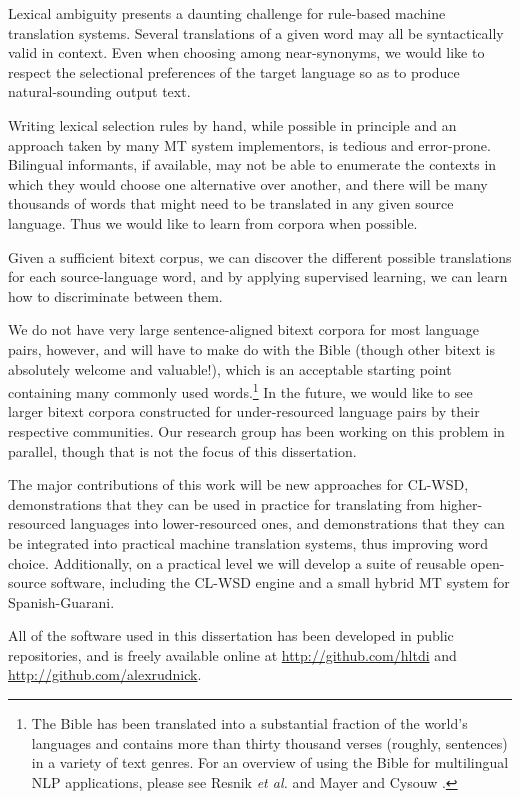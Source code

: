 Lexical ambiguity presents a daunting challenge for rule-based machine
translation systems. Several translations of a given word may all be
syntactically valid in context.
Even when choosing among near-synonyms, we would like to respect the
selectional preferences of the target language so as to produce
natural-sounding output text.

Writing lexical selection rules by hand, while possible in principle and an
approach taken by many MT system implementors, is tedious and error-prone.
Bilingual informants, if available, may not be able to enumerate the contexts
in which they would choose one alternative over another, and there will be many
thousands of words that might need to be translated in any given source
language. Thus we would like to learn from corpora when possible.

Given a sufficient bitext corpus, we can discover the different possible
translations for each source-language word, and by applying supervised
learning, we can learn how to discriminate between them.

We do not have very large sentence-aligned bitext corpora for most language
pairs, however, and will have to make do with the Bible (though other bitext is
absolutely welcome and valuable!), which is an acceptable
starting point containing many commonly used words.\footnote{The
Bible has been translated into a substantial fraction of the world's languages
and contains more than thirty thousand verses (roughly, sentences) in
a variety of text genres. For an overview of using the Bible for multilingual
NLP applications, please see Resnik \emph{et al.}
\cite{DBLP:journals/lre/ResnikOD99} and Mayer and Cysouw
\cite{MAYER14.220.L14-1215}.} In the future, we would like to see larger
bitext corpora constructed for under-resourced language pairs by their
respective communities. Our research group has been working on this problem in
parallel, though that is not the focus of this dissertation.

The major contributions of this work will be new approaches for CL-WSD,
demonstrations that they can be used in practice for translating from
higher-resourced languages into lower-resourced ones, and demonstrations that
they can be integrated into practical machine translation systems, thus
improving word choice.
Additionally, on a practical level we will develop a suite of reusable 
open-source software, including the CL-WSD engine and a small hybrid MT system
for Spanish-Guarani.

All of the software used in this dissertation has been developed in public
repositories, and is freely available online at
\url{http://github.com/hltdi} and \url{http://github.com/alexrudnick}.

